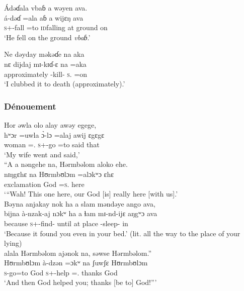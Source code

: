 \ea 
 Ádəɗala vbaɓ  a  wəyen  ava.\\
\gll á-dəɗ           =ala     \dentalflap aɓ         a     wijɛŋ      ava\\
\textsc{s}+{\IFV}-fall  =to      \textsc{id}falling    at    ground   on\\
\glt ‘He fell on the ground \textit{vbaɓ}.’
\z

\ea
 Ne {dəyday}  məkəɗe  na  aka\\
\gll nɛ {dijdaj}              mɪ-kɪɗ-ɛ      na      =aka\\
{\oneS}  approximately     {\NOM}{}-kill-{\CL}  \textsc{s}.{\DO}   =on\\
\glt ‘I clubbed it to death (approximately).’
\z

\subsubsection*{Dénouement}
\ea Hor  əwla   olo  alay  awəy  egege,\\
\gll hʷɔr     =uwla      \`ɔ{}-lɔ   =alaj            awij ɛgɛgɛ\\
woman ={\oneS}.{\POSS} \textsc{s}+{\PFV}-go =to           said that\\
\glt ‘My wife went and said,’\\

\medskip
 “{A a}  nəngehe  na,  Hərmbəlom  aloko  ehe.\\
     nɪŋgɛhɛ   na   Hʊrmbʊlɔm   =alɔkʷɔ        ɛhɛ\\
exclamation   {\DEM}     {\PSP}  God =\textsc{s}.{\POSS}   here \\
\glt ‘“Wah! This one here, our God [is] really here [with us].’\\

\medskip
 Bəyna  anjakay  nok  ha  a  slam  məndəye  ango  ava,\\
\gll bijna      à-nzak-aj          nɔkʷ   ha      a    ɬam      mɪ-nd-ijɛ        aŋgʷɔ  ava\\
because   \textsc{s}+{\PFV}-find{}-{\CL}  {\twoS}      until  at      place  {\NOM}{}-sleep-{\CL}  {\twoS}       in\\
\glt ‘Because it found you even in your bed.’ (lit. all the way to the place of your lying)\\

\medskip
 alala  Hərmbəlom  ajənok  na,  səwse   Hərmbəlom.”\\
   Hʊrmbʊlɔm    à-dzən    =ɔkʷ     {na   ʃuwʃɛ}   Hʊrmbʊlɔm\\
\textsc{s}-go=to  God         \textsc{s}+{\PFV}-help  ={\twoS}.{\IO}  {{\PSP}  thanks}   God\\
\glt ‘And then God helped you; thanks [be to] God!”’
\z

